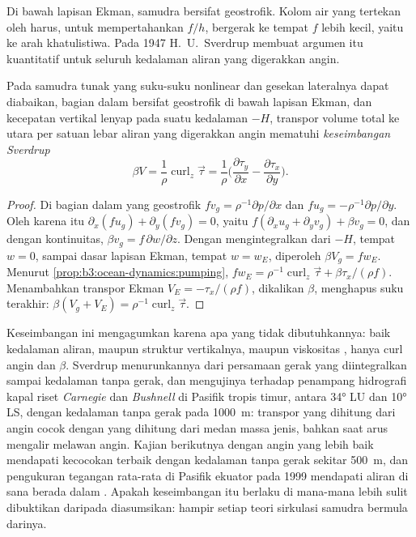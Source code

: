 Di bawah lapisan Ekman, samudra bersifat geostrofik. Kolom air yang
tertekan oleh  harus, untuk mempertahankan  $f/h$,
bergerak ke tempat $f$ lebih kecil, yaitu ke arah khatulistiwa. Pada 1947 H.~U.~Sverdrup
membuat argumen itu kuantitatif untuk seluruh kedalaman aliran yang digerakkan angin.

\begin{theorem}\label{thm:b3:ocean-dynamics:sverdrup}
Pada samudra tunak yang suku-suku nonlinear dan gesekan lateralnya
dapat diabaikan, bagian dalam bersifat geostrofik di bawah lapisan Ekman, dan
kecepatan vertikal lenyap pada suatu kedalaman $-H$, transpor volume total ke utara
per satuan lebar aliran yang digerakkan angin mematuhi \emph{keseimbangan
Sverdrup}
\[
\beta V = \frac{1}{\rho}\operatorname{curl}_z\vec\tau
= \frac{1}{\rho}\Big(\frac{\partial\tau_y}{\partial x} -
\frac{\partial\tau_x}{\partial y}\Big) .
\]
\end{theorem}

\begin{proof}
Di bagian dalam yang geostrofik $fv_g = \rho^{-1}\partial p/\partial x$ dan
$fu_g = -\rho^{-1}\partial p/\partial y$. Oleh karena itu $\partial_x(fu_g) +
\partial_y(fv_g) = 0$, yaitu $f(\partial_xu_g + \partial_yv_g) + \beta
v_g = 0$, dan dengan kontinuitas, $\beta v_g = f\,\partial w/\partial z$.
Dengan mengintegralkan dari $-H$, tempat $w = 0$, sampai dasar lapisan Ekman,
tempat $w = w_E$, diperoleh $\beta V_g = fw_E$. Menurut
\cref{prop:b3:ocean-dynamics:pumping}, $fw_E = \rho^{-1}\operatorname{curl}_z
\vec\tau + \beta\tau_x/(\rho f)$. Menambahkan transpor Ekman $V_E =
-\tau_x/(\rho f)$, dikalikan $\beta$, menghapus suku terakhir:
$\beta(V_g + V_E) = \rho^{-1}\operatorname{curl}_z\vec\tau$.
\end{proof}

Keseimbangan ini mengagumkan karena apa yang tidak dibutuhkannya: baik kedalaman
aliran, maupun struktur vertikalnya, maupun viskositas , hanya
curl angin dan $\beta$. Sverdrup menurunkannya dari persamaan
gerak yang diintegralkan sampai kedalaman tanpa gerak, dan mengujinya terhadap
penampang hidrografi kapal riset \emph{Carnegie} dan
\emph{Bushnell} di Pasifik tropis timur, antara \ang{34} LU dan
\ang{10} LS, dengan kedalaman tanpa gerak pada \qty{1000}{m}: transpor yang
dihitung dari angin cocok dengan yang dihitung dari medan massa jenis, bahkan
saat arus mengalir melawan angin. Kajian berikutnya dengan angin yang lebih baik
mendapati kecocokan terbaik dengan kedalaman tanpa gerak sekitar \qty{500}{m}, dan
pengukuran tegangan rata-rata di Pasifik ekuator pada 1999 mendapati
aliran di sana berada dalam . Apakah keseimbangan itu berlaku
di mana-mana lebih sulit dibuktikan daripada diasumsikan: hampir setiap teori
sirkulasi samudra bermula darinya.

